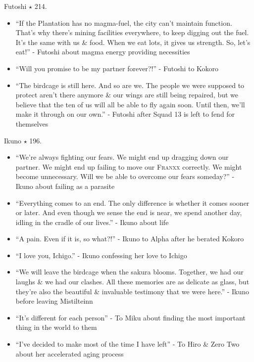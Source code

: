 \documentclass{article}
\begin{document}
\begin{enumerate}
\begin{itemize}
    \end{itemize}
    {\sc Futoshi $\star$ 214.}
    \begin{itemize}
    	\item ``If the Plantation has no magma-fuel, the city can't maintain function. That's why there's mining facilities everywhere, to keep digging out the fuel. It's the same with us \& food. When we eat lots, it gives us strength. So, let's eat!'' - Futoshi about magma energy providing necessities
    	\item ``Will you promise to be my partner forever?!'' - Futoshi to Kokoro
    	\item ``The birdcage is still here. And so are we. The people we were supposed to protect aren't there anymore \& our wings are still being repaired, but we believe that the ten of us will all be able to fly again soon. Until then, we'll make it through on our own.'' - Futoshi after Squad 13 is left to fend for themselves
    \end{itemize}
    {\sc Ikuno $\star$ 196.}
    \begin{itemize}
    	\item ``We're always fighting our fears. We might end up dragging down our partner. We might end up failing to move our \textsc{Franxx} correctly. We might become unnecessary. Will we be able to overcome our fears someday?'' - Ikuno about failing as a parasite
    	\item ``Everything comes to an end. The only difference is whether it comes sooner or later. And even though we sense the end is near, we spend another day, idling in the cradle of our lives.'' - Ikuno about life
    	\item ``A pain. Even if it is, so what?!'' - Ikuno to Alpha after he berated Kokoro
    	\item ``I love you, Ichigo.'' - Ikuno confessing her love to Ichigo
    	\item ``We will leave the birdcage when the sakura blooms. Together, we had our laughs \& we had our clashes. All these memories are as delicate as glass, but they're also the beautiful \& invaluable testimony that we were here.'' - Ikuno before leaving Mistilteinn
    	\item ``It's different for each person'' - To Miku about finding the most important thing in the world to them
    	\item ``I've decided to make most of the time I have left'' - To Hiro \& Zero Two about her accelerated aging process
    \end{itemize}

\end{enumerate}
\end{document}
